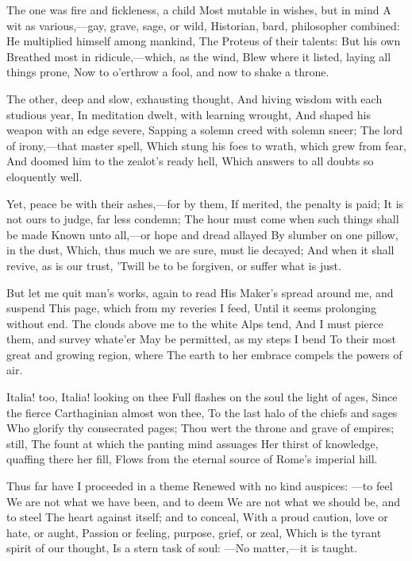 \documentclass[10pt,twocolumn]{book}
\begin{document}
   The one was fire and fickleness, a child
   Most mutable in wishes, but in mind
   A wit as various,---gay, grave, sage, or wild,\textemdash
   Historian, bard, philosopher combined:
   He multiplied himself among mankind,
   The Proteus of their talents:  But his own
   Breathed most in ridicule,---which, as the wind,
   Blew where it listed, laying all things prone,\textemdash
Now to o'erthrow a fool, and now to shake a throne.


   The other, deep and slow, exhausting thought,
   And hiving wisdom with each studious year,
   In meditation dwelt, with learning wrought,
   And shaped his weapon with an edge severe,
   Sapping a solemn creed with solemn sneer;
   The lord of irony,---that master spell,
   Which stung his foes to wrath, which grew from fear,
   And doomed him to the zealot's ready hell,
Which answers to all doubts so eloquently well.

   Yet, peace be with their ashes,---for by them,
   If merited, the penalty is paid;
   It is not ours to judge, far less condemn;
   The hour must come when such things shall be made
   Known unto all,---or hope and dread allayed
   By slumber on one pillow, in the dust,
   Which, thus much we are sure, must lie decayed;
   And when it shall revive, as is our trust,
'Twill be to be forgiven, or suffer what is just.


   But let me quit man's works, again to read
   His Maker's spread around me, and suspend
   This page, which from my reveries I feed,
   Until it seems prolonging without end.
   The clouds above me to the white Alps tend,
   And I must pierce them, and survey whate'er
   May be permitted, as my steps I bend
   To their most great and growing region, where
The earth to her embrace compels the powers of air.


   Italia! too, Italia! looking on thee
   Full flashes on the soul the light of ages,
   Since the fierce Carthaginian almost won thee,
   To the last halo of the chiefs and sages
   Who glorify thy consecrated pages;
   Thou wert the throne and grave of empires; still,
   The fount at which the panting mind assuages
   Her thirst of knowledge, quaffing there her fill,
Flows from the eternal source of Rome's imperial hill.

   Thus far have I proceeded in a theme
   Renewed with no kind auspices: ---to feel
   We are not what we have been, and to deem
   We are not what we should be, and to steel
   The heart against itself; and to conceal,
   With a proud caution, love or hate, or aught,\textemdash
   Passion or feeling, purpose, grief, or zeal,\textemdash
   Which is the tyrant spirit of our thought,
Is a stern task of soul: ---No matter,---it is taught.
\end{document}
